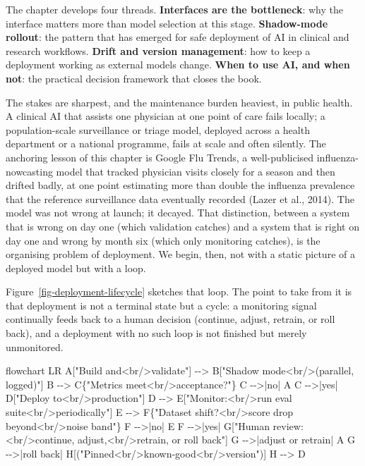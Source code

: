 \documentclass[
  letterpaper,
  11pt]{scrbook}
\newenvironment{Shaded}{\begin{snugshade}}{\end{snugshade}}
\newcommand{\NormalTok}[1]{\textcolor[rgb]{0.00,0.23,0.31}{#1}}
\begin{document}
The chapter develops four threads. \textbf{Interfaces are the
bottleneck}: why the interface matters more than model selection at this
stage. \textbf{Shadow-mode rollout}: the pattern that has emerged for
safe deployment of AI in clinical and research workflows. \textbf{Drift
and version management}: how to keep a deployment working as external
models change. \textbf{When to use AI, and when not}: the practical
decision framework that closes the book.

The stakes are sharpest, and the maintenance burden heaviest, in public
health. A clinical AI that assists one physician at one point of care
fails locally; a population-scale surveillance or triage model, deployed
across a health department or a national programme, fails at scale and
often silently. The anchoring lesson of this chapter is Google Flu
Trends, a well-publicised influenza-nowcasting model that tracked
physician visits closely for a season and then drifted badly, at one
point estimating more than double the influenza prevalence that the
reference surveillance data eventually recorded (Lazer et al., 2014).
The model was not wrong at launch; it decayed. That distinction, between
a system that is wrong on day one (which validation catches) and a
system that is right on day one and wrong by month six (which only
monitoring catches), is the organising problem of deployment. We begin,
then, not with a static picture of a deployed model but with a loop.

Figure~\ref{fig-deployment-lifecycle} sketches that loop. The point to
take from it is that deployment is not a terminal state but a cycle: a
monitoring signal continually feeds back to a human decision (continue,
adjust, retrain, or roll back), and a deployment with no such loop is
not finished but merely unmonitored.

\begin{Shaded}
\begin{Highlighting}[]
\NormalTok{flowchart LR}
\NormalTok{  A["Build and\textless{}br/\textgreater{}validate"] {-}{-}\textgreater{} B["Shadow mode\textless{}br/\textgreater{}(parallel, logged)"]}
\NormalTok{  B {-}{-}\textgreater{} C\{"Metrics meet\textless{}br/\textgreater{}acceptance?"\}}
\NormalTok{  C {-}{-}\textgreater{}|no| A}
\NormalTok{  C {-}{-}\textgreater{}|yes| D["Deploy to\textless{}br/\textgreater{}production"]}
\NormalTok{  D {-}{-}\textgreater{} E["Monitor:\textless{}br/\textgreater{}run eval suite\textless{}br/\textgreater{}periodically"]}
\NormalTok{  E {-}{-}\textgreater{} F\{"Dataset shift?\textless{}br/\textgreater{}score drop beyond\textless{}br/\textgreater{}noise band"\}}
\NormalTok{  F {-}{-}\textgreater{}|no| E}
\NormalTok{  F {-}{-}\textgreater{}|yes| G["Human review:\textless{}br/\textgreater{}continue, adjust,\textless{}br/\textgreater{}retrain, or roll back"]}
\NormalTok{  G {-}{-}\textgreater{}|adjust or retrain| A}
\NormalTok{  G {-}{-}\textgreater{}|roll back| H[("Pinned\textless{}br/\textgreater{}known{-}good\textless{}br/\textgreater{}version")]}
\NormalTok{  H {-}{-}\textgreater{} D}
\end{Highlighting}
\end{Shaded}
\end{document}
